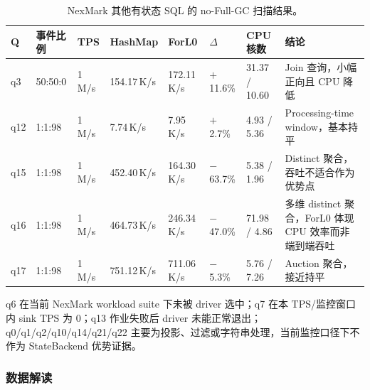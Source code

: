 \documentclass[a4paper,11pt]{article}
\begin{document}
\begin{table}[H]
\centering
\scriptsize
\begin{tabularx}{\textwidth}{L{0.75cm} L{1.15cm} R{0.9cm} R{1.05cm} R{1.05cm} R{0.95cm} R{1.25cm} X}
\toprule
\textbf{Q} & \textbf{事件比例} & \textbf{TPS} & \textbf{HashMap} & \textbf{ForL0} & $\Delta$ & \textbf{CPU 核数} & \textbf{结论} \\
\midrule
q3  & 50:50:0 & 1\,M/s & 154.17\,K/s & 172.11\,K/s & $+$11.6\% & 31.37 / 10.60 & Join 查询，小幅正向且 CPU 降低 \\
q12 & 1:1:98  & 1\,M/s & 7.74\,K/s   & 7.95\,K/s   & $+$2.7\%  & 4.93 / 5.36   & Processing-time window，基本持平 \\
q15 & 1:1:98  & 1\,M/s & 452.40\,K/s & 164.30\,K/s & $-$63.7\% & 5.38 / 1.96   & Distinct 聚合，吞吐不适合作为优势点 \\
q16 & 1:1:98  & 1\,M/s & 464.73\,K/s & 246.34\,K/s & $-$47.0\% & 71.98 / 4.86  & 多维 distinct 聚合，ForL0 体现 CPU 效率而非端到端吞吐 \\
q17 & 1:1:98  & 1\,M/s & 751.12\,K/s & 711.06\,K/s & $-$5.3\%  & 5.76 / 7.26   & Auction 聚合，接近持平 \\
\bottomrule
\end{tabularx}
\caption{NexMark 其他有状态 SQL 的 no-Full-GC 扫描结果。}
\label{tab:nexmark-extra-sql}
\end{table}

q6 在当前 NexMark workload suite 下未被 driver 选中；q7 在本 TPS/监控窗口内 sink TPS 为 0；q13 作业失败后 driver 未能正常退出；q0/q1/q2/q10/q14/q21/q22 主要为投影、过滤或字符串处理，当前监控口径下不作为 StateBackend 优势证据。

\subsubsection{数据解读}
\end{document}
